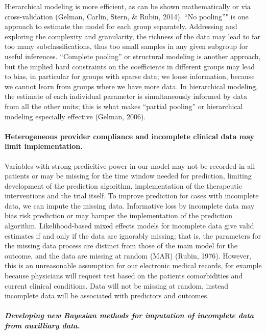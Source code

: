 \documentclass[]{article}
\begin{document}
Hierarchical modeling is more efficient, as can be shown mathematically
or via cross-validation (Gelman, Carlin, Stern, \& Rubin, 2014). ``No
pooling''" is one approach to estimate the model for each group
separately. Addressing and exploring the complexity and granularity, the
richness of the data may lead to far too many subclassifications, thus
too small samples in any given subgroup for useful inferences.
``Complete pooling'' or structural modeling is another approach, but the
implied hard constraints on the coefficients in different groups may
lead to bias, in particular for groups with sparse data; we loose
information, because we cannot learn from groups where we have more
data. In hierarchical modeling, the estimate of each individual
parameter is simultaneously informed by data from all the other units;
this is what makes ``partial pooling'' or hierarchical modeling
especially effective (Gelman, 2006).

\paragraph{Heterogeneous provider compliance and incomplete clinical
data may limit
implementation.}\label{heterogeneous-provider-compliance-and-incomplete-clinical-data-may-limit-implementation.}

Variables with strong predicitive power in our model may not be recorded
in all patients or may be missing for the time window needed for
prediction, limiting development of the prediction algorithm,
implementation of the therapeutic interventions and the trial itself. To
improve prediction for cases with incomplete data, we can impute the
missing data. Informative loss by incomplete data may bias risk
prediction or may hamper the implementation of the prediction algorithm.
Likelihood-based mixed effects models for incomplete data give valid
estimates if and only if the data are ignorably missing; that is, the
parameters for the missing data process are distinct from those of the
main model for the outcome, and the data are missing at random (MAR)
(Rubin, 1976). However, this is an unreasonable assumption for our
electronic medical records, for example because physicians will request
test based on the patients comorbidities and current clinical
conditions. Data will not be missing at random, instead incomplete data
will be associated with predictors and outcomes.

\subparagraph{Developing new Bayesian methods for imputation of
incomplete data from auxilliary
data.}\label{developing-new-bayesian-methods-for-imputation-of-incomplete-data-from-auxilliary-data.}
\end{document}
